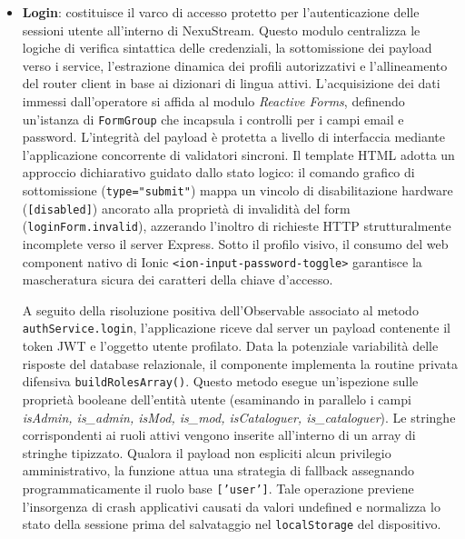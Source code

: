 \documentclass[11pt,a4paper]{article}
\begin{document}
\begin{itemize}
    Il modulo estende il paradigma degli aggiornamenti ottimistici all'interno della gestione della coda di visione personale dell'utente (\texttt{continueWatching}). Se un utente decide di escludere un contenuto dal proprio feed tramite l'interfaccia di opzioni, il metodo \texttt{removeFromContinueWatching} esegue preventivamente un filtraggio sul Signal reattivo locale, rimuovendo visivamente l'elemento dal DOM in tempo reale. Successivamente, l'applicazione inoltra in background il payload transazionale verso l'endpoint REST (\texttt{updateEpisodeInteraction}) configurando il marcatore \texttt{isDropped: 1}. Qualora la comunicazione HTTP fallisca per anomalie di rete, il blocco di intercettazione dell'errore esegue un rollback dello stato ripristinando la collezione salvata nel backup \texttt{oldList} e informando l'utente tramite un avviso pop-up emesso dal \texttt{ToastController};
    \item \textbf{Login}: costituisce il varco di accesso protetto per l'autenticazione delle sessioni utente all'interno di NexuStream. Questo modulo centralizza le logiche di verifica sintattica delle credenziali, la sottomissione dei payload verso i service, l'estrazione dinamica dei profili autorizzativi e l'allineamento del router client in base ai dizionari di lingua attivi. L'acquisizione dei dati immessi dall'operatore si affida al modulo \textit{Reactive Forms}, definendo un'istanza di \texttt{FormGroup} che incapsula i controlli per i campi email e password. L'integrità del payload è protetta a livello di interfaccia mediante l'applicazione concorrente di validatori sincroni. Il template HTML adotta un approccio dichiarativo guidato dallo stato logico: il comando grafico di sottomissione (\texttt{type="submit"}) mappa un vincolo di disabilitazione hardware (\texttt{[disabled]}) ancorato alla proprietà di invalidità del form (\texttt{loginForm.invalid}), azzerando l'inoltro di richieste HTTP strutturalmente incomplete verso il server Express. Sotto il profilo visivo, il consumo del web component nativo di Ionic \texttt{<ion-input-password-toggle>} garantisce la mascheratura sicura dei caratteri della chiave d'accesso.
    
    A seguito della risoluzione positiva dell'Observable associato al metodo \texttt{authService.login}, l'applicazione riceve dal server un payload contenente il token JWT e l'oggetto utente profilato. Data la potenziale variabilità delle risposte del database relazionale, il componente implementa la routine privata difensiva \texttt{buildRolesArray()}. Questo metodo esegue un'ispezione sulle proprietà booleane dell'entità utente (esaminando in parallelo i campi \textit{isAdmin, is\_admin, isMod, is\_mod, isCataloguer, is\_cataloguer}). Le stringhe corrispondenti ai ruoli attivi vengono inserite all'interno di un array di stringhe tipizzato. Qualora il payload non espliciti alcun privilegio amministrativo, la funzione attua una strategia di fallback assegnando programmaticamente il ruolo base \texttt{['user']}. Tale operazione previene l'insorgenza di crash applicativi causati da valori undefined e normalizza lo stato della sessione prima del salvataggio nel \texttt{localStorage} del dispositivo.
    

\end{itemize}
\end{document}

